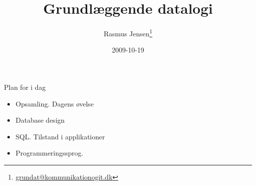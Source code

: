 \documentclass[a4paper,landscape]{slides}
\title{Grundlæggende datalogi}
\author{Rasmus Jensen\footnote{\url{grundat@kommunikationogit.dk}}}
\date{2009-10-19}
\begin{document}
\maketitle

\begin{comment}

- Opsamling samt praktisk
    - Spørgsmål
    - Oprettelse af database - både via python og sqlite3-kommando
    - NB: SQL kommandoer kan lægges i fil
    - Midtvejsevaluering næste uge.
    - Evt. SQL-eksempel adressebog+tilknytning
- Øvelse: Bruger/login-system
    - Lav et python cgi-script, der sender en hjemmeside med loginformular til webbrowseren. Action på scriptet skal være selve programmet. (En del af øvelsen er at de forskellige sider ligger i en og samme fil.)
    - Lav en database med brugernavne, kodeord og login-id
    - Udvid cgi-scriptet så det tjekker om brugernavn+kodeord er i databasen og skriver en fejlmeddelse hvis det er forkert.
    - Lav en formular der kun kan udfyldes hvis brugernavn+koderord er korrekt.
    - Gem resultatet af formularen i databasen sammen med login-id. Hint: login-id kan overføres via et hidden-inputfelt.

- Database design (normalisering)
    - Eksempel adressebog+tilknytning
    - Separate tabeller for hvert sæt af egenskaber
    - Primær nøgle
    - Flyt data gentaget i rækker til separate tabeller
    - Eliminér kolonner der ikke afhænger af nøgle.

- Mere SQL
    - Agregate functions
    - Nested selects 
- Tilstand i program
    - Flere sider fra samme program, - dispatch
    - Stateful vs. stateless connection, - hidden fields

- Programmeringssprog
    - Generelle programmeringsteknikker vs. konkrete sprog
    - Syntaks og semantik
    - Scriptingsprog, systemprogrammeringssprog
    - Programmeringsparadigmer: procedural programmering, OOP, funktionsorienteret programmering, logikprogrammering.
    - Dynamisk og statiske typer.
    - Torsdag: JavaScript

- Spørgsmål?


\end{comment}

\begin{slide}
	\begin{center} {\large 
            Plan for i dag
	} \end{center}
	\begin{itemize} \addtolength{\itemsep}{-\baselineskip}
		\item Opsamling. Dagens øvelse
                \item Database design
                \item SQL. Tilstand i applikationer
                \item Programmeringssprog. 
	\end{itemize}
\end{slide}
\end{document}
